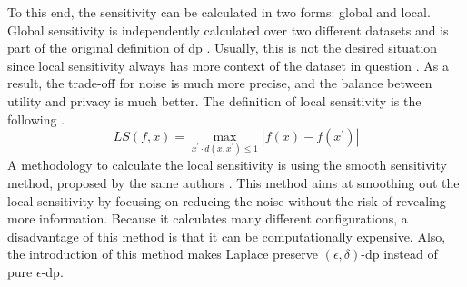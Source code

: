 To this end, the sensitivity can be calculated in two forms: global and local.
Global sensitivity is independently calculated over two different datasets and is part of the original definition of \gls{dp} \citep{dwork_differential_2006}.
Usually, this is not the desired situation since local sensitivity always has more context of the dataset in question \citep{nissim_smooth_2007}.
As a result, the trade-off for noise is much more precise, and the balance between utility and privacy is much better.
The definition of local sensitivity is the following \citep{nissim_smooth_2007}.
\begin{equation}
  LS(f,x)=\operatorname*{max}_{x^{\prime}\cdot d(x,x^{\prime})\leq1}|f(x)-f(x^{\prime})|
  \label{local-sensitivity}
\end{equation}
A methodology to calculate the local sensitivity is using the smooth sensitivity method, proposed by the same authors \citep{nissim_smooth_2007}.
This method aims at smoothing out the local sensitivity by focusing on reducing the noise without the risk of revealing more information.
Because it calculates many different configurations, a disadvantage of this method is that it can be computationally expensive.
Also, the introduction of this method makes Laplace preserve $(\epsilon, \delta)$-\gls{dp} instead of pure $\epsilon$-\gls{dp}.




